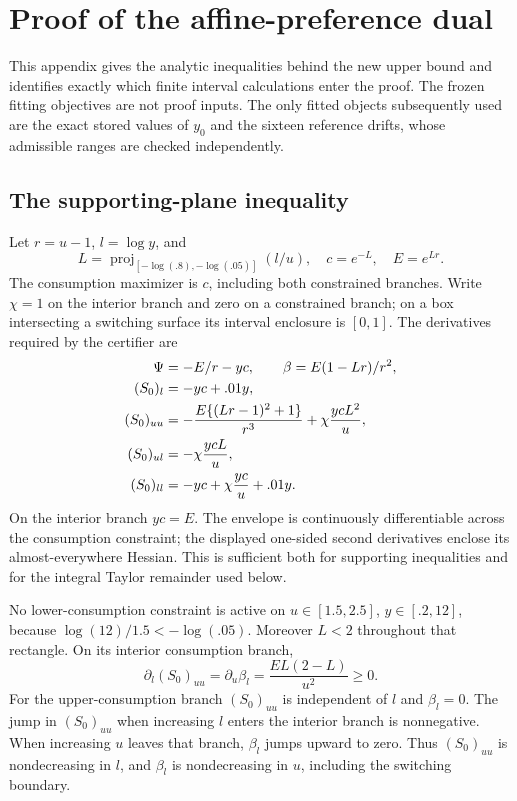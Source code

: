 \section{Proof of the affine-preference dual}\label{r10:proof:dual}
This appendix gives the analytic inequalities behind the new upper bound and identifies exactly which finite interval calculations enter the proof. The frozen fitting objectives are not proof inputs. The only fitted objects subsequently used are the exact stored values of $y_0$ and the sixteen reference drifts, whose admissible ranges are checked independently.

\subsection{The supporting-plane inequality}\label{r10:proof:plane}
Let $r=u-1$, $l=\log y$, and
\[
 L=\operatorname{proj}_{[-\log(.8),-\log(.05)]}(l/u),\quad
 c=e^{-L},\quad E=e^{Lr}.
\]
The consumption maximizer is $c$, including both constrained branches. Write $\chi=1$ on the interior branch and zero on a constrained branch; on a box intersecting a switching surface its interval enclosure is $[0,1]$. The derivatives required by the certifier are
\begin{align}
 \Psi&=-E/r-yc,\qquad \beta=E(1-Lr)/r^2,\notag\\
 (S_0)_l&=-yc+.01y,\notag\\
 (S_0)_{uu}&=-\frac{E\{(Lr-1)^2+1\}}{r^3}+\chi\frac{ycL^2}{u},\label{r10:jets}\\
 (S_0)_{ul}&=-\chi\frac{ycL}{u},\notag\\
 (S_0)_{ll}&=-yc+\chi\frac{yc}{u}+.01y.\notag
\end{align}
On the interior branch $yc=E$. The envelope is continuously differentiable across the consumption constraint; the displayed one-sided second derivatives enclose its almost-everywhere Hessian. This is sufficient both for supporting inequalities and for the integral Taylor remainder used below.

No lower-consumption constraint is active on $u\in[1.5,2.5]$, $y\in[.2,12]$, because $\log(12)/1.5<-\log(.05)$. Moreover $L<2$ throughout that rectangle. On its interior consumption branch,
\begin{equation}
 \partial_l(S_0)_{uu}=\partial_u\beta_l
       =\frac{EL(2-L)}{u^2}\geq0.\label{r10:monotonejets}
\end{equation}
For the upper-consumption branch $(S_0)_{uu}$ is independent of $l$ and $\beta_l=0$. The jump in $(S_0)_{uu}$ when increasing $l$ enters the interior branch is nonnegative. When increasing $u$ leaves that branch, $\beta_l$ jumps upward to zero. Thus $(S_0)_{uu}$ is nondecreasing in $l$, and $\beta_l$ is nondecreasing in $u$, including the switching boundary.

